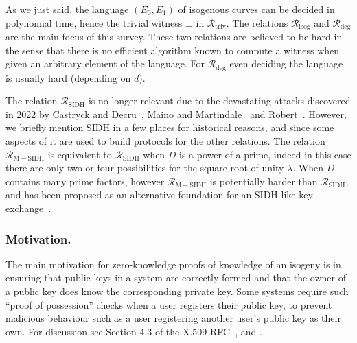 \documentclass{llncs}
\newcommand{\R}[1][]{\ensuremath{\mathcal{R}_{\mathrm{#1}}}}
\newcommand{\comment}[1]{{\color{gray}#1}}
\newcommand{\CP}[1]{\comment{Christophe: #1}}
\newcommand{\LDF}[1]{\comment{Luca: #1}}
\begin{document}

As we just said, the language $(E_0,E_1)$ of isogenous curves can be decided in polynomial time, hence the trivial witness $\bot$ in \R[triv].
The relations \R[isog] and \R[deg] are the main focus of this survey.
These two relations are believed to be hard in the sense that there is no efficient algorithm known to compute a witness when given an arbitrary element of the language. For $\R[deg]$ even deciding the language is usually hard (depending on $d$).

The relation \R[SIDH] is no longer relevant due to the devastating attacks discovered in 2022 by Castryck and Decru~\cite{CD22}, Maino and Martindale~\cite{MM22} and Robert~\cite{Rob22}. However, we briefly mention SIDH in a few places for historical reasons, and since some aspects of it are used to build protocols for the other relations. The relation \R[M-SIDH] is equivalent to \R[SIDH] when $D$ is a power of a prime, indeed in this case there are only two or four possibilities for the square root of unity $\lambda$. When $D$ contains many prime factors, however \R[M-SIDH] is potentially harder than \R[SIDH], and has been proposed as an alternative foundation for an SIDH-like key exchange~\cite{cryptoeprint:2022/1019,cryptoeprint:2022/1054}.





\subsubsection{Motivation.}
%
The main motivation for zero-knowledge proofs of knowledge of an isogeny is in ensuring that public keys in a system are correctly formed and that the owner of a public key does know the corresponding private key. Some systems require such ``proof of possession'' checks when a user registers their public key, to prevent malicious behaviour such as a user registering another user's public key as their own. For discussion see Section 4.3 of the X.509 RFC~\cite{X509}, and \cite{BFPW07}. 
\end{document}
